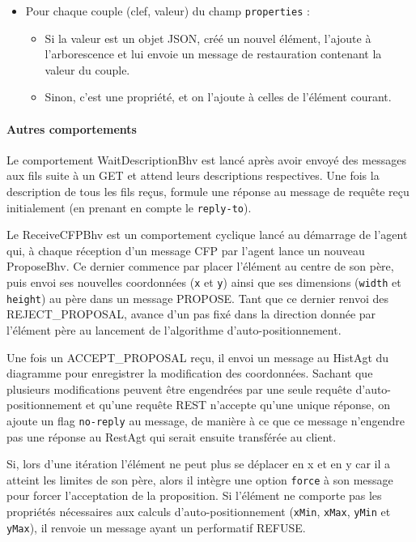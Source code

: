 \begin{itemize}
	\begin{itemize}
		\item Pour chaque couple (clef, valeur) du champ \lstinline$properties$ :
		\begin{itemize}
			\item Si la valeur est un objet JSON, créé un nouvel élément, l'ajoute à l'arborescence et lui envoie un message de restauration contenant la valeur du couple.
			\item Sinon, c'est une propriété, et on l'ajoute à celles de l'élément courant.
		\end{itemize}
	\end{itemize}
\end{itemize}

\newpage
\paragraph{Autres comportements}
Le comportement WaitDescriptionBhv est lancé après avoir envoyé des messages aux fils suite à un GET et attend leurs descriptions respectives.
Une fois la description de tous les fils reçus, formule une réponse au message de requête reçu initialement (en prenant en compte le \lstinline$reply-to$).

Le ReceiveCFPBhv est un comportement cyclique lancé au démarrage de l'agent qui, à chaque réception d'un message CFP par l'agent lance un nouveau ProposeBhv.
Ce dernier commence par placer l'élément au centre de son père, puis envoi ses nouvelles coordonnées (\lstinline$x$ et \lstinline$y$) ainsi que ses dimensions (\lstinline$width$ et \lstinline$height$) au père dans un message PROPOSE.
Tant que ce dernier renvoi des REJECT\_PROPOSAL, avance d'un pas fixé dans la direction donnée par l'élément père au lancement de l'algorithme d'auto-positionnement.

Une fois un ACCEPT\_PROPOSAL reçu, il envoi un message au HistAgt du diagramme pour enregistrer la modification des coordonnées.
Sachant que plusieurs modifications peuvent être engendrées par une seule requête d'auto-positionnement et qu'une requête REST n'accepte qu'une unique réponse, on ajoute un flag \lstinline$no-reply$ au message, de manière à ce que ce message n'engendre pas une réponse au RestAgt qui serait ensuite transférée au client.

Si, lors d'une itération l'élément ne peut plus se déplacer en x et en y car il a atteint les limites de son père, alors il intègre une option \lstinline$force$ à son message pour forcer l'acceptation de la proposition.
Si l'élément ne comporte pas les propriétés nécessaires aux calculs d'auto-positionnement (\lstinline$xMin$, \lstinline$xMax$, \lstinline$yMin$ et \lstinline$yMax$), il renvoie un message ayant un performatif REFUSE.

